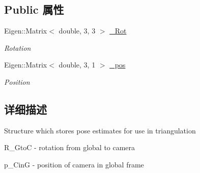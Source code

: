 \subsection*{Public 属性}
\begin{DoxyCompactItemize}
\item 
\mbox{\label{structov__core_1_1FeatureInitializer_1_1ClonePose_ae235244ea20c0bea763b5ec50610ff4c}} 
Eigen\+::\+Matrix$<$ double, 3, 3 $>$ \hyperlink{structov__core_1_1FeatureInitializer_1_1ClonePose_ae235244ea20c0bea763b5ec50610ff4c}{\+\_\+\+Rot}
\begin{DoxyCompactList}\small\item\em Rotation \end{DoxyCompactList}\item 
\mbox{\label{structov__core_1_1FeatureInitializer_1_1ClonePose_a242e4f9f5640ee0fe7210e60093ec801}} 
Eigen\+::\+Matrix$<$ double, 3, 1 $>$ \hyperlink{structov__core_1_1FeatureInitializer_1_1ClonePose_a242e4f9f5640ee0fe7210e60093ec801}{\+\_\+pos}
\begin{DoxyCompactList}\small\item\em Position \end{DoxyCompactList}\end{DoxyCompactItemize}


\subsection{详细描述}
Structure which stores pose estimates for use in triangulation 


\begin{DoxyItemize}
\item R\+\_\+\+GtoC -\/ rotation from global to camera
\item p\+\_\+\+CinG -\/ position of camera in global frame 
\end{DoxyItemize}